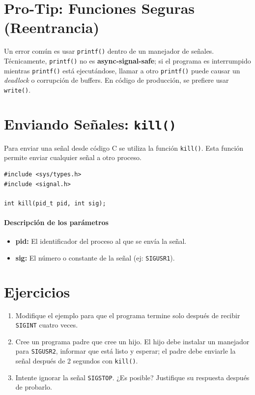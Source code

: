 \documentclass[12pt,a4paper]{article}
\begin{document}
\section{Pro-Tip: Funciones Seguras (Reentrancia)}
Un error común es usar \texttt{printf()} dentro de un manejador de señales. Técnicamente, \texttt{printf()} no es \textbf{async-signal-safe}; si el programa es interrumpido mientras \texttt{printf()} está ejecutándose, llamar a otro \texttt{printf()} puede causar un \textit{deadlock} o corrupción de buffers. En código de producción, se prefiere usar \texttt{write()}.

\section{Enviando Señales: \texttt{kill()}}
Para enviar una señal desde código C se utiliza la función \texttt{kill()}. Esta función permite enviar cualquier señal a otro proceso.

\begin{lstlisting}[numbers=none]
#include <sys/types.h>
#include <signal.h>

int kill(pid_t pid, int sig);
\end{lstlisting}

\paragraph{Descripción de los parámetros}
\begin{itemize}
    \item \textbf{pid:} El identificador del proceso al que se envía la señal.
    \item \textbf{sig:} El número o constante de la señal (ej: \texttt{SIGUSR1}).
\end{itemize}

\section{Ejercicios}
\begin{enumerate}
    \item Modifique el ejemplo para que el programa termine solo después de recibir \texttt{SIGINT} cuatro veces.
    \item Cree un programa padre que cree un hijo. El hijo debe instalar un manejador para \texttt{SIGUSR2}, informar que está listo y esperar; el padre debe enviarle la señal después de 2 segundos con \texttt{kill()}.
    \item Intente ignorar la señal \texttt{SIGSTOP}. ¿Es posible? Justifique su respuesta después de probarlo.
\end{enumerate}
\end{document}

